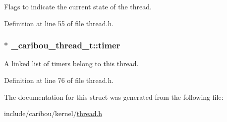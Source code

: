 Flags to indicate the current state of the thread. 



Definition at line 55 of file thread.\-h.

\hypertarget{struct__caribou__thread__t_a0b044d7f5d93f8d457ff985f0f7e4bd3}{
\subsubsection[{timer}]{$\ast$ \-\_\-caribou\-\_\-thread\-\_\-t\-::timer}}\label{struct__caribou__thread__t_a0b044d7f5d93f8d457ff985f0f7e4bd3}


A linked list of timers belong to this thread. 



Definition at line 76 of file thread.\-h.



The documentation for this struct was generated from the following file\-:\begin{DoxyCompactItemize}
\item 
include/caribou/kernel/\hyperlink{thread_8h}{thread.\-h}\end{DoxyCompactItemize}
